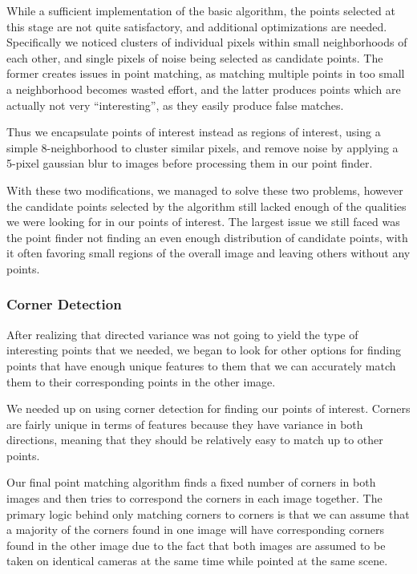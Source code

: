While a sufficient implementation of the basic algorithm, the points selected at this stage are not quite satisfactory, and additional optimizations are needed. Specifically we noticed clusters of individual pixels within small neighborhoods of each other, and single pixels of noise being selected as candidate points. The former creates issues in point matching, as matching multiple points in too small a neighborhood becomes wasted effort, and the latter produces points which are actually not very ``interesting'', as they easily produce false matches.

Thus we encapsulate points of interest instead as regions of interest, using a simple 8-neighborhood to cluster similar pixels, and remove noise by applying a 5-pixel gaussian blur to images before processing them in our point finder.

With these two modifications, we managed to solve these two problems, however the candidate points selected by the algorithm still lacked enough of the qualities we were looking for in our points of interest. The largest issue we still faced was the point finder not finding an even enough distribution of candidate points, with it often favoring small regions of the overall image and leaving others without any points.

\subsubsection{Corner Detection}
After realizing that directed variance was not going to yield the type of interesting points that we needed, we began to look for other options for finding points that have enough unique features to them that we can accurately match them to their corresponding points in the other image. 

We needed up on using corner detection for finding our points of interest. Corners are fairly unique in terms of features because they have variance in both directions, meaning that they should be relatively easy to match up to other points. 

Our final point matching algorithm finds a fixed number of corners in both images and then tries to correspond the corners in each image together. The primary logic behind only matching corners to corners is that we can assume that a majority of the corners found in one image will have corresponding corners found in the other image due to the fact that both images are assumed to be taken on identical cameras at the same time while pointed at the same scene.

